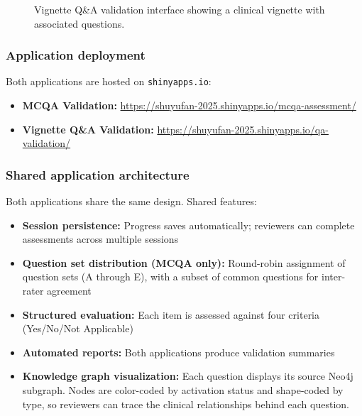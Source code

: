 \begin{figure}[h]
\centering
\caption{Vignette Q\&A validation interface showing a clinical vignette with associated questions.}
\label{fig:vignette-screenshot}
\end{figure}

\subsubsection{Application deployment}
Both applications are hosted on \texttt{shinyapps.io}:

\begin{itemize}
    \item \textbf{MCQA Validation:} \url{https://shuyufan-2025.shinyapps.io/mcqa-assessment/}
    \item \textbf{Vignette Q\&A Validation:} \url{https://shuyufan-2025.shinyapps.io/qa-validation/}
\end{itemize}

\subsubsection{Shared application architecture}
Both applications share the same design. Shared features:

\begin{itemize}
    \item \textbf{Session persistence:} Progress saves automatically; reviewers can complete assessments across multiple sessions
    \item \textbf{Question set distribution (MCQA only):} Round-robin assignment of question sets (A through E), with a subset of common questions for inter-rater agreement
    \item \textbf{Structured evaluation:} Each item is assessed against four criteria (Yes/No/Not Applicable)
    \item \textbf{Automated reports:} Both applications produce validation summaries
    \item \textbf{Knowledge graph visualization:} Each question displays its source Neo4j subgraph. Nodes are color-coded by activation status and shape-coded by type, so reviewers can trace the clinical relationships behind each question.
\end{itemize}

